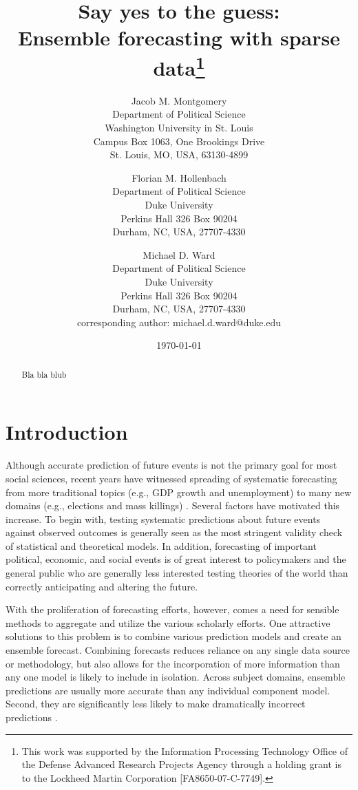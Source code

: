 \documentclass[12pt,fullpage,endnotes]{article}
\title{Say yes to the guess: \\Ensemble forecasting with sparse data\thanks{This work was supported by the Information Processing Technology Office of the
    Defense Advanced Research Projects Agency through a
    holding grant is to the Lockheed Martin Corporation [FA8650-07-C-7749].}}
\author{
Jacob M. Montgomery\\
	Department of Political Science\\
	Washington University in St. Louis\\
	Campus Box 1063, One Brookings Drive\\
	St. Louis, MO, USA, 63130-4899 
	\and
Florian M. Hollenbach  \\
	Department of Political Science\\
	Duke University\\
	Perkins Hall 326 Box 90204\\
	Durham, NC, USA, 27707-4330
	\and
Michael D. Ward\\
	Department of Political Science\\
	Duke University\\
	Perkins Hall 326 Box 90204\\
	Durham, NC, USA, 27707-4330\\
	corresponding author: michael.d.ward@duke.edu
}
\date{\today}
\begin{document}


\maketitle
\thispagestyle{empty}
\clearpage
\pagestyle{myheadings}
\newpage

\thispagestyle{empty}


\begin{abstract}
 Bla bla blub
\end{abstract}



\setcounter{page}{1}

\section{Introduction}

Although accurate prediction of future events is not the primary goal
for most social sciences, recent years have witnessed spreading of
systematic forecasting from more traditional topics (e.g., GDP growth
and unemployment) to many new domains (e.g., elections and mass
killings) .  Several factors have motivated this increase.  To begin
with, testing systematic predictions about future events against
observed outcomes is generally seen as the most stringent validity
check of statistical and theoretical models.  In addition, forecasting
of important political, economic, and social events is of great
interest to policymakers and the general public who are generally less
interested testing theories of the world than correctly anticipating
and altering the future.

With the proliferation of forecasting efforts, however, comes a need
for sensible methods to aggregate and utilize the various scholarly
efforts.  One attractive solutions to this problem is to combine
various prediction models and create an ensemble forecast.  Combining
forecasts reduces reliance on any single data source or methodology,
but also allows for the incorporation of more information than any one
model is likely to include in isolation.  Across subject domains,
ensemble predictions are usually more accurate than any individual
component model. Second, they are signiﬁcantly less likely to make
dramatically incorrect predictions \citep{Bates:1969, Armstrong:2001,
  Raftery:2005}.
\end{document}
